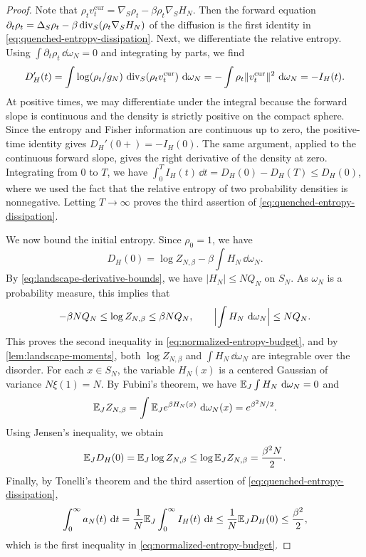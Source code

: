 \begin{proof}
Note that $\rho_tv^{\mathrm{cur}}_t=\nabla_S\rho_t-\beta\rho_t\nabla_SH_N$. Then the forward equation $\partial_t\rho_t=\Delta_S\rho_t-\beta\operatorname{div}_S(\rho_t\nabla_SH_N)$ of the diffusion is the first identity in \eqref{eq:quenched-entropy-dissipation}. Next, we differentiate the relative entropy. Using $\int\partial_t\rho_t\,\dd\omega_N=0$ and integrating by parts, we find
\[
 D_H'(t)=\int\log(\rho_t/g_N)\,\operatorname{div}_S(\rho_tv^{\mathrm{cur}}_t)\,\mathop{}\!\mathrm d\omega_N
 =-\int\rho_t\lVert v^{\mathrm{cur}}_t\rVert^2\,\mathop{}\!\mathrm d\omega_N=-I_H(t).
\]
At positive times, we may differentiate under the integral because the forward slope is continuous and the density is strictly positive on the compact sphere. Since the entropy and Fisher information are continuous up to zero, the positive-time identity gives $D_H'(0+)=-I_H(0)$. The same argument, applied to the continuous forward slope, gives the right derivative of the density at zero. Integrating from $0$ to $T$, we have $\int_0^TI_H(t)\,\dd t=D_H(0)-D_H(T)\le D_H(0)$, where we used the fact that the relative entropy of two probability densities is nonnegative. Letting $T\to\infty$ proves the third assertion of \eqref{eq:quenched-entropy-dissipation}.

We now bound the initial entropy. Since $\rho_0=1$, we have
\[
 D_H(0)=\log Z_{N,\beta}-\beta\int H_N\,\dd\omega_N.
\]
By \eqref{eq:landscape-derivative-bounds}, we have $|H_N|\le NQ_N$ on $S_N$. As $\omega_N$ is a probability measure, this implies that
\[
 -\beta NQ_N\le\log Z_{N,\beta}\le\beta NQ_N,
 \qquad
 \Bigl|\int H_N\,\mathop{}\!\mathrm d\omega_N\Bigr|\le NQ_N.
\]
This proves the second inequality in \eqref{eq:normalized-entropy-budget}, and by \cref{lem:landscape-moments}, both $\log Z_{N,\beta}$ and $\int H_N\,\dd\omega_N$ are integrable over the disorder. For each $x\in S_N$, the variable $H_N(x)$ is a centered Gaussian of variance $N\xi(1)=N$. By Fubini's theorem, we have $\mathbb E_J\int H_N\,\mathop{}\!\mathrm d\omega_N=0$ and
\[
 \mathbb E_JZ_{N,\beta}=\int\mathbb E_Je^{\beta H_N(x)}\,\mathop{}\!\mathrm d\omega_N(x)=e^{\beta^2N/2}.
\]
Using Jensen's inequality, we obtain
\[
 \mathbb E_JD_H(0)=\mathbb E_J\log Z_{N,\beta}\le\log\mathbb E_JZ_{N,\beta}=\frac{\beta^2N}{2}.
\]
Finally, by Tonelli's theorem and the third assertion of \eqref{eq:quenched-entropy-dissipation},
\[
 \int_0^\infty a_N(t)\,\mathop{}\!\mathrm d t=\frac1N\mathbb E_J\int_0^\infty I_H(t)\,\mathop{}\!\mathrm d t\le\frac1N\mathbb E_JD_H(0)\le\frac{\beta^2}{2},
\]
which is the first inequality in \eqref{eq:normalized-entropy-budget}.
\end{proof}


